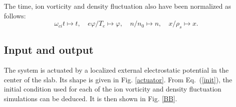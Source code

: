 \documentclass[12pt,lot, lof]{puthesis}
\begin{document}
The time, ion vorticity and density fluctuation also have been normalized as follows:
\begin{equation}
\omega_{ci} t \mapsto t, \quad e \varphi/ T_e \mapsto \varphi, \quad n /n_0 \mapsto n, \quad x/ \rho_s
 \mapsto x.
 \end{equation}


\subsection{Input and output}
The system is actuated by a localized external electrostatic potential in the center of the slab. Its shape is given in Fig. \ref{actuator}. From Eq.~(\ref{init}), the initial condition used for each of the ion vorticity and density fluctuation simulations can be deduced. It is then shown in Fig. \ref{BB}.
\end{document}
